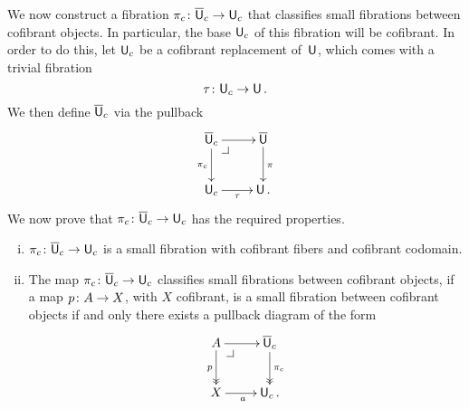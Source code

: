 \documentclass[reqno,10pt,a4paper,oneside,draft]{amsart}
\begin{document}
\bigskip

We now  construct a fibration $\pi_c \colon \overline{\mathsf{U}}_c \to \mathsf{U}_c$ that classifies small fibrations between 
cofibrant objects. In particular, the base $\mathsf{U}_c$ of this fibration will be cofibrant.  In order to do this, let $\mathsf{U}_c$ be a cofibrant replacement of~$\mathsf{U}$,  which comes with a trivial fibration
\begin{equation}
\label{equ:ucu}
\tau \colon \mathsf{U}_c \rightarrow \mathsf{U} \, .
\end{equation}
We then define $\overline{\mathsf{U}}_c$ via the pullback
\begin{equation}
\label{equ:def-of-pi-c}
\begin{gathered}
\xymatrix{
\UU_c \ar[d]_{\pi_c} \ar[r] \drpullback & \UU \ar[d]^{\pi}  \\
\U_c \ar[r]_\tau & \U \, .}
\end{gathered}
\end{equation}
We now prove that $\pi_c \colon \overline{\mathsf{U}}_c \to \mathsf{U}_c$ has the required properties.

\begin{theorem} \label{thm:universe-uc} 
\hfill 
\begin{enumerate}[(i)] 
\item $\pi_c \colon \overline{\mathsf{U}}_c \to \mathsf{U}_c$ is a small fibration with cofibrant fibers and cofibrant codomain. 
\item The map $\pi_c \colon \overline{\mathsf{U}}_c \to \mathsf{U}_c$ classifies small fibrations between cofibrant
objects, \ie if a map $p \colon A \to X$, with $X$ cofibrant, is a small fibration between cofibrant objects
if and only there exists a pullback diagram of the form
\[
\xymatrix{
A \ar[r] \ar@{->>}[d]_p \drpullback & \UU_c \ar@{->>}[d]^{\pi_c} \\
X \ar[r]_a & \U_c \, . }
\]
\end{enumerate}
\end{theorem}
\end{document}
